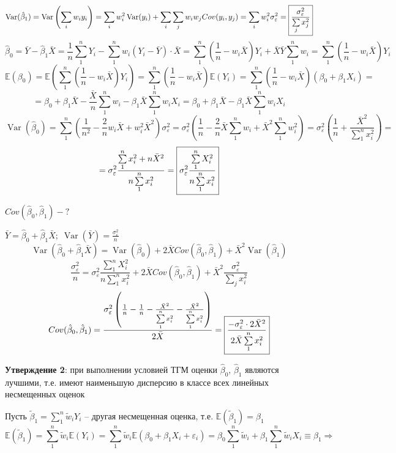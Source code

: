 \documentclass[12pt]{article}
\newcommand{\e}{\mathbb{E}}
\DeclareMathOperator{\var}{Var}
\renewcommand{\epsilon}{\varepsilon}
\newcommand{\msum}{\sum\limits_1^n}
\newcommand{\isum}{\sum\limits_i}
\newcommand{\jsum}{\sum\limits_j}
\begin{document}
$$\var(\hat{\beta}_1) = \var\left(\isum w_i y_i\right) = \isum w_i^2 \var(y_i) + \isum \jsum w_i w_j Cov(y_i, y_j) = \isum w_i^2 \sigma_{\epsilon}^2 = \fbox{\text{$\displaystyle\frac{\sigma_{\epsilon}^2}{\jsum x_j^2}$}}$$
$$\hat{\beta}_0 = \bar{Y} - \hat{\beta}_1 \bar{X} = \frac{1}{n} \msum Y_i - \msum w_i (Y_i - \bar{Y}) \cdot \bar{X} = \msum \left(\frac{1}{n} - w_i \bar{X}\right) Y_i + \bar{X} \bar{Y} \msum w_i = \msum\left(\frac{1}{n} - w_i \bar{X}\right) Y_i$$
$$\e(\beta_0) = \e\left(\msum\left(\frac{1}{n} - w_i \bar{X}\right) Y_i\right) = \msum\left(\frac{1}{n} - w_i \bar{X}\right) \e(Y_i) = \msum\left(\frac{1}{n} - w_i \bar{X}\right) (\beta_0 + \beta_1 X_i) =$$
$$= \beta_0 + \beta_1 \bar{X} - \frac{\bar{X}}{n} \msum w_i - \beta_1 \bar{X} \msum w_i X_i = \beta_0 + \beta_1 \bar{X} - \beta_1 \bar{X} \msum w_i X_i$$
$$\var(\hat{\beta}_0) = \msum \left(\frac{1}{n^2} - \frac{2}{n} w_i \bar{X} + w_i^2 \bar{X}^2\right) \sigma_{\epsilon}^2 = \sigma_{\epsilon}^2 \left(\frac{1}{n} - \frac{2}{n} \bar{X} \msum w_i + \bar{X}^2 \msum w_i^2\right) = \sigma_{\epsilon}^2 \left(\frac{1}{n} + \frac{\bar{X}^2}{\msum x_i^2}\right) =$$
$$= \sigma_{\epsilon}^2 \frac{\msum x_i^2 + n \bar{X}^2}{n \msum x_i^2} = \fbox{\text{$\displaystyle\sigma_{\epsilon}^2 \frac{\msum X_i^2}{n \msum x_i^2}$}}$$

$\displaystyle Cov(\hat{\beta}_0, \hat{\beta}_1) - ?$

$\displaystyle\bar{Y} = \hat{\beta}_0 + \hat{\beta}_1 \bar{X}; \; \var(\bar{Y}) = \frac{\sigma_{\epsilon}^2}{n}$
$$\var(\hat{\beta}_0 + \hat{\beta}_1 \bar{X}) = \var(\hat{\beta}_0) + 2 \bar{X} Cov(\hat{\beta}_0, \hat{\beta}_1) + \bar{X}^2 \var(\hat{\beta}_1)$$
$$\frac{\sigma_{\epsilon}^2}{n} = \sigma_{\epsilon}^2 \frac{\msum X_i^2}{n \msum x_i^2} + 2 \bar{X} Cov(\hat{\beta}_0, \hat{\beta}_1) + \bar{X}^2 \frac{\sigma_{\epsilon}^2}{\jsum x_i^2}$$
$$Cov(\hat{\beta}_0, \hat{\beta}_1) = \frac{\sigma_{\epsilon}^2 \left(\frac{1}{n} - \frac{1}{n} -  \frac{\bar{X}^2}{\msum x_i^2} - \frac{\bar{X}^2}{\msum x_i^2}\right)}{2\bar{X}} = \fbox{\text{$\displaystyle\frac{- \sigma_{\epsilon}^2 \cdot 2 \bar{X}^2}{2 \bar{X} \msum x_i^2}$}}$$

\textbf{Утверждение 2}: при выполнении условией ТГМ оценки $\hat{\beta}_0, \, \hat{\beta}_1$ являются лучшими, т.е. имеют наименьшую дисперсию в классе всех линейных несмещенных оценок

Пусть $\tilde{\beta}_1 = \msum \tilde{w}_i Y_i$ -- другая несмещенная оценка, т.е. $\e(\tilde{\beta}_1) = \beta_1$
$$\e(\tilde{\beta}_1) = \msum \tilde{w}_i \e(Y_i) = \msum \tilde{w}_i \e(\beta_0 + \beta_1 X_i + \epsilon_i) = \beta_0 \msum \tilde{w}_i + \beta_1 \msum \tilde{w}_i X_i \equiv \beta_1 \Rightarrow$$
\end{document}
